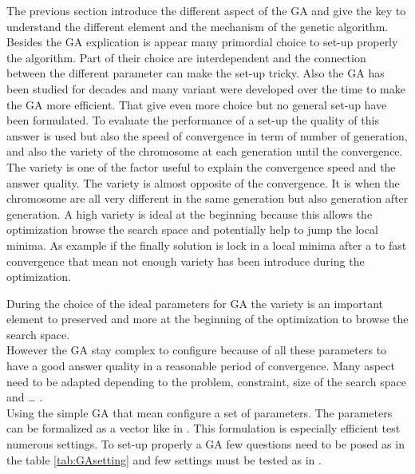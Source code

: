 The previous section introduce the different aspect of the GA and give the key to understand the different element and the mechanism of the genetic algorithm. Besides the GA explication is appear many primordial  choice  to set-up properly the algorithm. Part of their choice are interdependent and the connection between the different parameter can make the set-up tricky.
Also the GA has been studied for decades and many variant were developed over the time to make the GA more efficient. That give even more choice but no general set-up have been formulated.
To evaluate the  performance of a set-up the quality of this answer is used but also the speed of convergence in term of number of generation, and also the variety of the chromosome at each generation until the convergence. 
The variety is one of the factor useful to explain the convergence speed and the answer quality.
The variety is almost opposite of the convergence. It is when the chromosome  are all very different in the same generation but also generation after generation. A high variety is ideal at the beginning because this allows the optimization browse the search space and potentially help to jump the local minima. 
 As example if the finally solution is lock in a local minima after a to fast convergence that mean not enough variety has been introduce during the optimization.

During the choice of the ideal parameters for GA the variety is an important element to preserved and more at the beginning of the optimization to browse the search space.\\
 
However the GA stay complex to configure because of all these parameters to have a good answer quality in a reasonable period of convergence. Many aspect need to be adapted depending to the problem, constraint, size of the search space and … .  \\ 
Using the simple GA that mean configure a set of parameters. The parameters can be formalized as a vector like in \cite{71*grefenstette1986}. This formulation is especially  efficient test numerous settings. 
To set-up properly a GA few questions need to be posed as in the table \ref{tab:GAsetting} and few settings must be tested as in \cite{73*wright1991,71*grefenstette1986,133*schwefel1984}.

